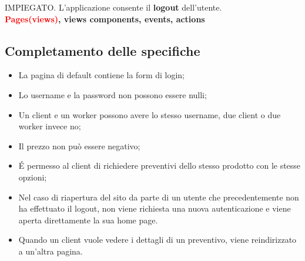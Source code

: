 \documentclass[a4paper, 12pt]{article}
\begin{document}
IMPIEGATO. L’applicazione consente il \textbf{\textcolor{myBrown}{logout}} dell’utente.\\

\noindent \textbf{\textcolor{red}{Pages(views)}, \textcolor{myGreen}{views components}, \textcolor{myBlue}{events}, \textcolor{myBrown}{actions}}
\subsection{Completamento delle specifiche}
\begin{itemize}
	\item La pagina di default contiene la form di login;
	\item Lo username e la password non possono essere nulli;
	\item Un client e un worker possono avere lo stesso username, due client o due worker invece no;
	\item Il prezzo non può essere negativo;
	\item \'E permesso al client di richiedere preventivi dello stesso prodotto con le stesse opzioni;
	\item Nel caso di riapertura del sito da parte di un utente che precedentemente non ha effettuato il logout, non viene richiesta una nuova autenticazione e viene aperta direttamente la sua home page.
	\item Quando un client vuole vedere i dettagli di un preventivo, viene reindirizzato a un'altra pagina.
 
\end{itemize}
\newpage
\end{document}

